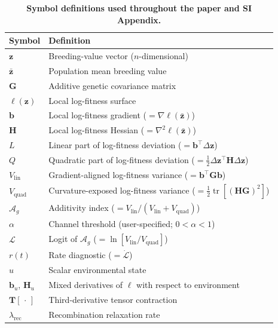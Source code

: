 \documentclass[11pt]{article}
\newcommand{\vect}[1]{\boldsymbol{#1}}
\newcommand{\mat}[1]{\mathbf{#1}}
\newcommand{\Ag}{\mathcal{A}_{g}}
\newcommand{\CalL}{\mathcal{L}}
\newcommand{\Vlin}{V_{\mathrm{lin}}}
\newcommand{\Vquad}{V_{\mathrm{quad}}}
\newcommand{\tr}{\operatorname{tr}}
\begin{document}
\begin{table}[ht]
\caption{\textbf{Symbol definitions used throughout the paper and
  SI Appendix.}}
\label{tab:S1}
\small
\begin{tabularx}{\textwidth}{lX}
\toprule
Symbol & Definition \\
\midrule
$\vect{z}$           & Breeding-value vector ($n$-dimensional) \\
$\bar{\vect{z}}$     & Population mean breeding value \\
$\mat{G}$            & Additive genetic covariance matrix \\
$\ell(\vect{z})$     & Local log-fitness surface \\
$\vect{b}$           & Local log-fitness gradient
                       ($= \nabla\ell(\bar{\vect{z}})$) \\
$\mat{H}$            & Local log-fitness Hessian
                       ($= \nabla^2\ell(\bar{\vect{z}})$) \\
$L$                  & Linear part of log-fitness deviation
                       ($= \vect{b}^\top\Delta\vect{z}$) \\
$Q$                  & Quadratic part of log-fitness deviation
                       ($= \tfrac{1}{2}\Delta\vect{z}^\top\mat{H}\Delta\vect{z}$) \\
$\Vlin$              & Gradient-aligned log-fitness variance
                       ($= \vect{b}^\top\mat{G}\vect{b}$) \\
$\Vquad$             & Curvature-exposed log-fitness variance
                       ($= \tfrac{1}{2}\tr[(\mat{H}\mat{G})^2]$) \\
$\Ag$                & Additivity index
                       ($= \Vlin/(\Vlin+\Vquad)$) \\
$\alpha$             & Channel threshold (user-specified; $0 < \alpha < 1$) \\
$\CalL$              & Logit of $\Ag$
                       ($= \ln[\Vlin/\Vquad]$) \\
$r(t)$               & Rate diagnostic ($= \dot{\CalL}$) \\
$u$                  & Scalar environmental state \\
$\vect{b}_u$, $\mat{H}_u$ & Mixed derivatives of $\ell$ with respect
                       to environment \\
$\mat{T}[\,\cdot\,]$ & Third-derivative tensor contraction \\
$\lambda_{\mathrm{rec}}$ & Recombination relaxation rate \\

\end{tabularx}
\end{table}
\end{document}
